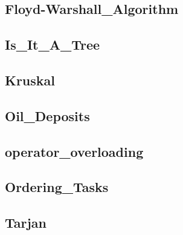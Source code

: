     \subsection{Floyd-Warshall_Algorithm}
        
    \subsection{Is_It_A_Tree}
        
    \subsection{Kruskal}
        
    \subsection{Oil_Deposits}
        
    \subsection{operator_overloading}
        
    \subsection{Ordering_Tasks}
        
    \subsection{Tarjan}
        